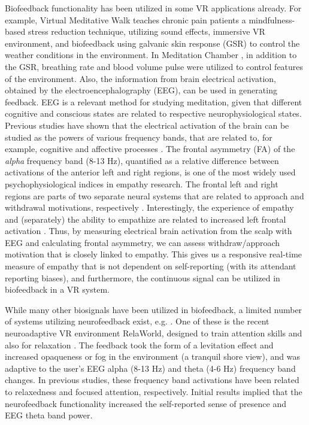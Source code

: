 \documentclass[manuscript, review = false, screen]{acmart}
\begin{document}
Biofeedback functionality has been utilized in some VR applications already. For example, Virtual Meditative Walk \cite{Gromala2015} teaches chronic pain patients a mindfulness-based stress reduction technique, utilizing sound effects, immersive VR environment, and biofeedback using galvanic skin response (GSR) to control the weather conditions in the environment. In Meditation Chamber \cite{Shaw2007}, in addition to the GSR, breathing rate and blood volume pulse were utilized to control features of the environment. Also, the information from brain electrical activation, obtained by the electroencephalography (EEG), can be used in generating feedback. EEG is a relevant method for studying meditation, given that different cognitive and conscious states are related to respective neurophysiological states. Previous studies have shown that the electrical activation of the brain can be studied as the powers of various frequency bands, that are related to, for example, cognitive and affective processes \cite{Aftanas2001,Klimesch1998,Klimesch1999}. The frontal asymmetry (FA) of the {\it alpha} frequency band (8-13 Hz), quantified as a relative difference between activations of the anterior left and right regions, is one of the most widely used psychophysiological indices in empathy research. The frontal left and right regions are parts of two separate neural systems that are related to approach and withdrawal motivations, respectively \cite{Klimesch1998,Klimesch1999}. Interestingly, the experience of empathy and (separately) the ability to empathize are related to increased left frontal activation \cite{Field2009,HarmonJones2003,JONES2009}. Thus, by measuring electrical brain activation from the scalp with EEG and calculating frontal asymmetry, we can assess withdraw/approach motivation that is closely linked to empathy. This gives us a responsive real-time measure of empathy that is not dependent on self-reporting (with its attendant reporting biases), and furthermore, the continuous signal can be utilized in biofeedback in a VR system.%

While many other biosignals have been utilized in biofeedback, a limited number of systems utilizing neurofeedback exist, e.g. \cite{Hinterberger2011,Sas}. One of these is the recent neuroadaptive VR environment RelaWorld, designed to train attention skills and also for relaxation \cite{Kosunen2017,Kosunen2016}. The feedback took the form of a levitation effect and increased opaqueness or fog in the environment (a tranquil shore view), and was adaptive to the user's EEG alpha (8-13 Hz) and theta (4-6 Hz) frequency band changes. In previous studies, these frequency band activations have been related to relaxedness and focused attention, respectively. Initial results implied that the neurofeedback functionality increased the self-reported sense of presence and EEG theta band power.
\end{document}
